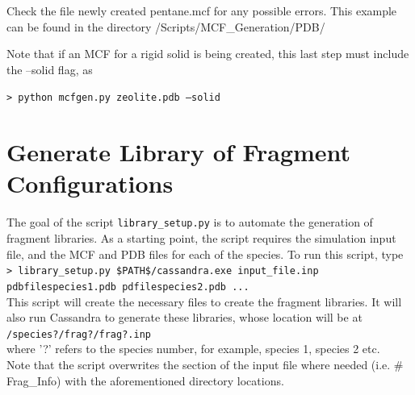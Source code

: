 Check the file newly created pentane.mcf for any possible errors. This example can be found in the directory 
/Scripts/MCF\_Generation/PDB/

Note that if an MCF for a rigid solid is being created, this last step must include the --solid flag, as

\texttt{> python mcfgen.py zeolite.pdb --solid} \\

\section{Generate Library of Fragment Configurations}
\label{sec:libgen}

The goal of the script \texttt{library\_setup.py} is to automate the generation of fragment libraries.
As a starting point, the script requires the simulation input file, and the MCF and PDB 
files for each of the species. To run this script, type \\

\texttt{> library\_setup.py \$PATH\$/cassandra.exe input\_file.inp pdbfilespecies1.pdb pdfilespecies2.pdb ...} \\

This script will create the necessary files to create the fragment libraries. It will also run Cassandra 
to generate these libraries, whose location will be at \\

\texttt{/species?/frag?/frag?.inp} \\

where '?' refers to the species number, for example, species 1, species 2 etc. \\

Note that the script overwrites the section of the input file where 
needed (i.e. \# Frag\_Info) with the aforementioned directory locations.
